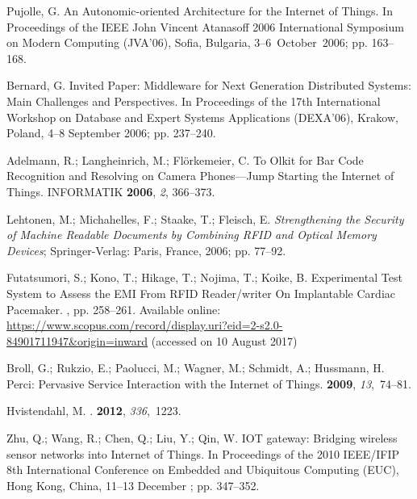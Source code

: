\documentclass[symmetry,article,accept,moreauthors,pdftex10pt,a4paper]{mdpi}
\begin{document}
\begin{thebibliography}{999}
Pujolle, G.
\newblock An Autonomic-oriented Architecture for the Internet of Things.
\newblock In Proceedings of the IEEE John Vincent Atanasoff 2006 International Symposium on Modern
Computing (JVA'06), Sofia, Bulgaria, 3--6~October~2006; pp. 163--168.

Bernard, G.
\newblock Invited Paper: Middleware for Next Generation Distributed Systems:
Main Challenges and Perspectives.
\newblock In Proceedings of the 17th International Workshop on Database and Expert Systems
Applications (DEXA'06), Krakow, Poland, 4--8 September 2006; pp. 237--240.

Adelmann, R.; Langheinrich, M.; Flörkemeier, C.
\newblock To Olkit for Bar Code Recognition and Resolving on Camera Phones---Jump Starting the Internet of Things.
\newblock INFORMATIK \textbf{2006}, \emph{2}, 366--373.

Lehtonen, M.; Michahelles, F.; Staake, T.; Fleisch, E.
\newblock \emph{Strengthening the Security of Machine Readable Documents by Combining
	RFID and Optical Memory Devices};
\newblock Springer-Verlag: Paris, France, 2006; pp. 77--92.

Futatsumori, S.; Kono, T.; Hikage, T.; Nojima, T.; Koike, B.
\newblock Experimental Test System to Assess the EMI From RFID Reader/writer On
Implantable Cardiac Pacemaker.
, pp. 258--261. Available online: \url{https://www.scopus.com/record/display.uri?eid=2-s2.0-84901711947&origin=inward} (accessed on 10 August 2017)

Broll, G.; Rukzio, E.; Paolucci, M.; Wagner, M.; Schmidt, A.; Hussmann, H.
\newblock Perci: Pervasive Service Interaction with the Internet of Things.
 {\bf 2009}, {\em 13},~74--81.

Hvistendahl, M.
.
 {\bf {2012}}, {\em {336}},~{1223}.

Zhu, Q.; Wang, R.; Chen, Q.; Liu, Y.; Qin, W.
\newblock IOT gateway: Bridging wireless sensor networks into Internet of
Things. In Proceedings of the 2010 IEEE/IFIP 8th International Conference on Embedded and Ubiquitous Computing (EUC), Hong Kong, China, 11--13 December
; pp. 347--352.


\end{thebibliography}
\end{document}
